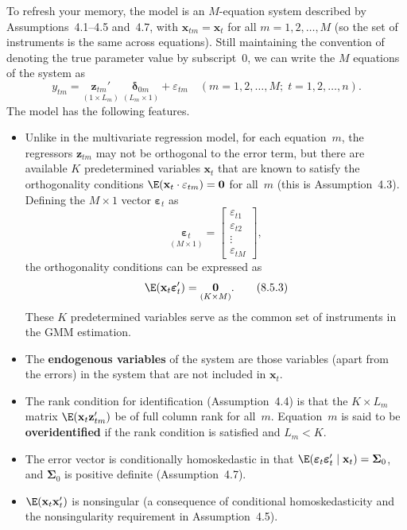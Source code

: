 To refresh your memory, the model is an $M$-equation system described by Assumptions~4.1--4.5 and~4.7, with $\mathbf{x}_{tm} = \mathbf{x}_t$ for all $m = 1, 2, \ldots, M$ (so the set of instruments is the same across equations). Still maintaining the convention of denoting the true parameter value by subscript~0, we can write the $M$ equations of the
system as
\begin{equation}
  y_{tm} = \underset{(1 \times L_m)}{\mathbf{z}_{tm}'} \;
  \underset{(L_m \times 1)}{\boldsymbol{\delta}_{0m}}
  + \varepsilon_{tm}
  \quad (m = 1, 2, \ldots, M;\; t = 1, 2, \ldots, n).
  \label{eq:8.5.1} \tag{8.5.1}
\end{equation}
The model has the following features.
\begin{itemize}
\item Unlike in the multivariate regression model, for each equation~$m$, the regressors $\mathbf{z}_{tm}$ may not be orthogonal to the error term, but there are available $K$ predetermined variables $\mathbf{x}_t$ that are known to satisfy the orthogonality conditions
  $\E(\mathbf{x}_t \cdot \varepsilon_{tm}) = \mathbf{0}$ for all~$m$ (this is Assumption~4.3). Defining the $M \times 1$ vector
  $\boldsymbol{\varepsilon}_t$ as
  \begin{equation}
    \underset{(M \times 1)}{\boldsymbol{\varepsilon}_t}
    = \begin{bmatrix} \varepsilon_{t1} \\ \varepsilon_{t2} \\ \vdots \\ \varepsilon_{tM} \end{bmatrix},
    \label{eq:8.5.2} \tag{8.5.2}
  \end{equation}
  the orthogonality conditions can be expressed as
  \begin{equation}
    \E(\mathbf{x}_t \boldsymbol{\varepsilon}_t') = \underset{(K \times M)}{\mathbf{0}}.
    \label{eq:8.5.3} \tag{8.5.3}
  \end{equation}
  These $K$ predetermined variables serve as the common set of instruments in the
  GMM estimation.

\item The \textbf{endogenous variables} of the system are those variables (apart from the
  errors) in the system that are not included in $\mathbf{x}_t$.

\item The rank condition for identification (Assumption~4.4) is that the $K \times L_m$ matrix
  $\E(\mathbf{x}_t\mathbf{z}_{tm}')$ be of full column rank for all~$m$. Equation~$m$ is said to be \textbf{overidentified} if the rank condition is satisfied and $L_m < K$.

\item The error vector is conditionally homoskedastic in that
  $\E(\boldsymbol{\varepsilon}_t\boldsymbol{\varepsilon}_t' \mid \mathbf{x}_t) = \boldsymbol{\Sigma}_0$, and
  $\boldsymbol{\Sigma}_0$ is positive definite (Assumption~4.7).

\item $\E(\mathbf{x}_t\mathbf{x}_t')$ is nonsingular (a consequence of conditional homoskedasticity and the
  nonsingularity requirement in Assumption~4.5).
\end{itemize}

